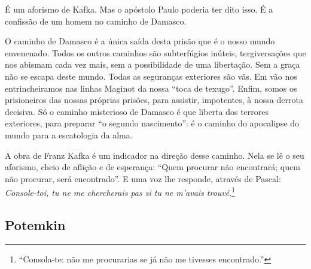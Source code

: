 \begin{quote}
\end{quote}

É um aforismo de Kafka.
Mas o apóstolo Paulo poderia ter dito isso. É a confissão de um homem no caminho de Damasco.

O caminho de Damasco é a única saída desta prisão que é o nosso mundo envenenado. Todos os outros caminhos são subterfúgios inúteis, tergiversações que nos abismam cada vez mais, sem a possibilidade de uma libertação.
Sem a graça não se escapa deste mundo. Todas as seguranças exteriores são vãs.
Em vão nos entrincheiramos nas linhas Maginot da nossa ``toca de texugo''.
Enfim, somos os prisioneiros das nossas próprias prisões, para assistir, impotentes, à
nossa derrota decisiva. Só o caminho misterioso de Damasco é que liberta dos terrores exteriores,
para preparar ``o segundo nascimento'': é o caminho do apocalipse do
mundo para a escatologia da alma.

A obra de Franz Kafka é um indicador
na direção desse caminho. Nela se lê o
seu aforismo, cheio de aflição e de esperança: ``Quem procurar não
encontrará; quem não procurar, será encontrado''. E uma voz lhe responde, através de Pascal:
\textit{Console-toi, tu ne me chercherais pas si tu ne m'avais trouvé}.\footnote{``Consola-te: não me procurarias se já não me tivesses encontrado.''}



\subsection{Potemkin}

